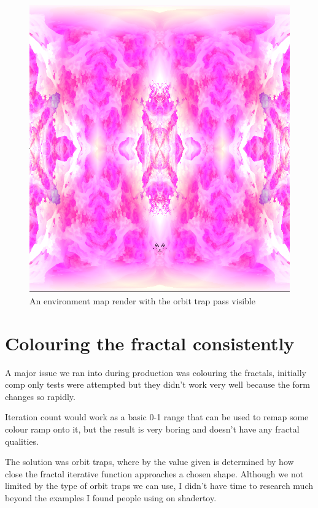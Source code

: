 \documentclass[11pt,a4paper,final,notitlepage]{report}
\begin{document}
\begin{figure}
\begin{center}
\includegraphics[scale=0.5]{images/orbitenv}
\caption{An environment map render with the orbit trap pass visible}
\label{fig:path_tracing}
\end{center}
\end{figure}


\section{Colouring the fractal consistently}

A major issue we ran into during production was colouring the fractals, initially comp only tests were attempted but they didn't work very well because the form changes so rapidly.

Iteration count would work as a basic 0-1 range that can be used to remap some colour ramp onto it, but the result is very boring and doesn't have any fractal qualities.

The solution was orbit traps, where by the value given is determined by how close the fractal iterative function approaches a chosen shape. Although we not limited by the type of orbit traps we can use, I didn't have time to research much beyond the examples I found people using on shadertoy.
\end{document}

